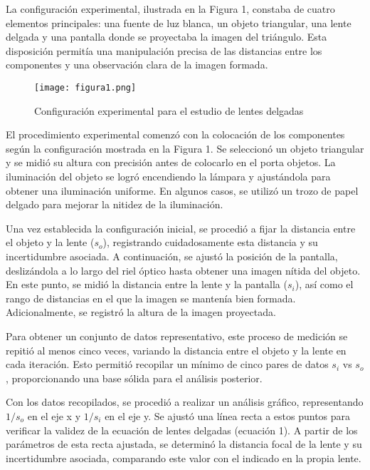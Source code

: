 \documentclass[twocolumn,a4paper,11pt]{scrartcl}
\begin{document}
La configuración experimental, ilustrada en la Figura 1, constaba de cuatro elementos principales: una fuente de luz blanca, un objeto triangular, una lente delgada y una pantalla donde se proyectaba la imagen del triángulo. Esta disposición permitía una manipulación precisa de las distancias entre los componentes y una observación clara de la imagen formada.

\begin{figure}[h]
    \centering
    \texttt{[image: figura1.png]}
    \caption{Configuración experimental para el estudio de lentes delgadas}
    \label{fig:setup}
\end{figure}

El procedimiento experimental comenzó con la colocación de los componentes según la configuración mostrada en la Figura 1. Se seleccionó un objeto triangular y se midió su altura con precisión antes de colocarlo en el porta objetos. La iluminación del objeto se logró encendiendo la lámpara y ajustándola para obtener una iluminación uniforme. En algunos casos, se utilizó un trozo de papel delgado para mejorar la nitidez de la iluminación.

Una vez establecida la configuración inicial, se procedió a fijar la distancia entre el objeto y la lente ($s_o$), registrando cuidadosamente esta distancia y su incertidumbre asociada. A continuación, se ajustó la posición de la pantalla, deslizándola a lo largo del riel óptico hasta obtener una imagen nítida del objeto. En este punto, se midió la distancia entre la lente y la pantalla ($s_i$), así como el rango de distancias en el que la imagen se mantenía bien formada. Adicionalmente, se registró la altura de la imagen proyectada.

Para obtener un conjunto de datos representativo, este proceso de medición se repitió al menos cinco veces, variando la distancia entre el objeto y la lente en cada iteración. Esto permitió recopilar un mínimo de cinco pares de datos $s_i$ vs $s_o$, proporcionando una base sólida para el análisis posterior.

Con los datos recopilados, se procedió a realizar un análisis gráfico, representando $1/s_o$ en el eje x y $1/s_i$ en el eje y. Se ajustó una línea recta a estos puntos para verificar la validez de la ecuación de lentes delgadas (ecuación 1). A partir de los parámetros de esta recta ajustada, se determinó la distancia focal de la lente y su incertidumbre asociada, comparando este valor con el indicado en la propia lente.
\end{document}
